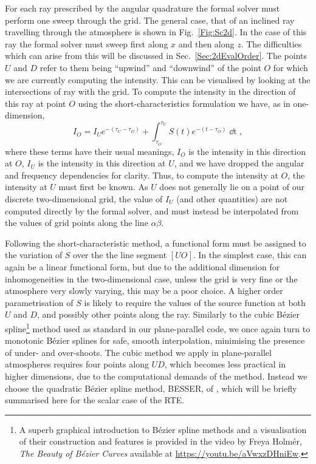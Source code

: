 For each ray prescribed by the angular quadrature the formal solver must perform one sweep through the grid.
The general case, that of an inclined ray travelling through the atmosphere is shown in Fig.~\ref{Fig:Sc2d}.
In the case of this ray the formal solver must sweep first along $x$ and then along $z$.
The difficulties which can arise from this will be discussed in Sec.~\ref{Sec:2dEvalOrder}.
The points $U$ and $D$ refer to them being ``upwind'' and ``downwind'' of the point $O$ for which we are currently computing the intensity.
This can be visualised by looking at the intersections of ray with the grid.
To compute the intensity in the direction of this ray at point $O$ using the short-characteristics formulation we have, as in one-dimension,
\begin{equation}\label{Eq:MiniScDefinition}
   I_O = I_U e^{-(\tau_U - \tau_O)} + \int_{\tau_O}^{\tau_U} S(t) e^{-(t - \tau_O)} \mathop{\dd{}t},
\end{equation}
where these terms have their usual meanings, $I_O$ is the intensity in this direction at $O$, $I_U$ is the intensity in this direction at $U$, and we have dropped the angular and frequency dependencies for clarity.
Thus, to compute the intensity at $O$, the intensity at $U$ must first be known.
As $U$ does not generally lie on a point of our discrete two-dimensional grid, the value of $I_U$ (and other quantities) are not computed directly by the formal solver, and must instead be interpolated from the values of grid points along the line $\alpha\beta$.

Following the short-characteristic method, a functional form must be assigned to the variation of $S$ over the the line segment $[UO]$.
In the simplest case, this can again be a linear functional form, but due to the additional dimension for inhomogeneities in the two-dimensional case, unless the grid is very fine or the atmosphere very slowly varying, this may be a poor choice.
A higher order parametrisation of $S$ is likely to require the values of the source function at both $U$ and $D$, and possibly other points along the ray.
Similarly to the cubic Bézier spline\footnote{A superb graphical introduction to Bézier spline methods and a visualisation of their construction and features is provided in the video by Freya Holmér, \emph{The Beauty of Bézier Curves} available at \url{https://youtu.be/aVwxzDHniEw}.} method used as standard in our plane-parallel code, we once again turn to monotonic Bézier splines for safe, smooth interpolation, minimising the presence of under- and over-shoots.
The cubic method we apply in plane-parallel atmospheres requires four points along $UD$, which becomes less practical in higher dimensions, due to the computational demands of the method.
Instead we choose the quadratic Bézier spline method, BESSER, of \citet{Stepan2013}, which will be briefly summarised here for the scalar case of the RTE.

